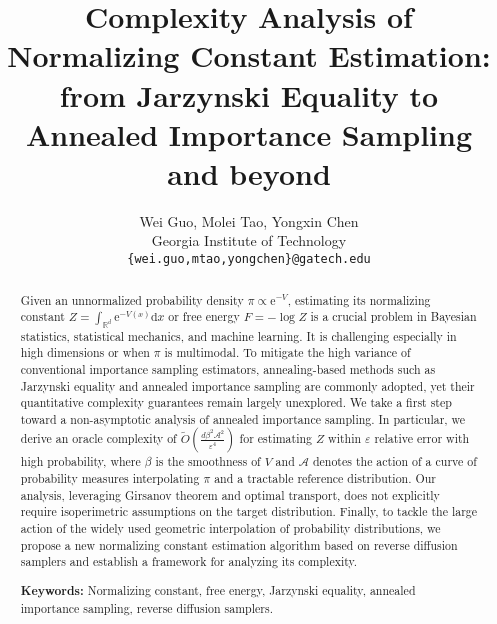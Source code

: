 \documentclass[10pt]{article}
\title{Complexity Analysis of Normalizing Constant Estimation: from Jarzynski Equality to Annealed Importance Sampling and beyond}
\author{Wei Guo, Molei Tao, Yongxin Chen\\Georgia Institute of Technology\\\texttt{\{wei.guo,mtao,yongchen\}@gatech.edu}}
\date{}
\begin{document}
\maketitle
\begin{abstract}
    Given an unnormalized probability density $\pi\propto\mathrm{e}^{-V}$, estimating its normalizing constant $Z=\int_{\mathbb{R}^d}\mathrm{e}^{-V(x)}\mathrm{d}x$ or free energy $F=-\log Z$ is a crucial problem in Bayesian statistics, statistical mechanics, and machine learning. It is challenging especially in high dimensions or when $\pi$ is multimodal. To mitigate the high variance of conventional importance sampling estimators, annealing-based methods such as Jarzynski equality and annealed importance sampling are commonly adopted, yet their quantitative complexity guarantees remain largely unexplored. We take a first step toward a non-asymptotic analysis of annealed importance sampling. In particular, we derive an oracle complexity of $\widetilde{O}\left(\frac{d\beta^2{\mathcal{A}}^2}{\varepsilon^4}\right)$ for estimating $Z$ within $\varepsilon$ relative error with high probability, where $\beta$ is the smoothness of $V$ and $\mathcal{A}$ denotes the action of a curve of probability measures interpolating $\pi$ and a tractable reference distribution. Our analysis, leveraging Girsanov theorem and optimal transport, does not explicitly require isoperimetric assumptions on the target distribution. Finally, to tackle the large action of the widely used geometric interpolation of probability distributions, we propose a new normalizing constant estimation algorithm based on reverse diffusion samplers and establish a framework for analyzing its complexity.

    \noindent\textbf{Keywords:} Normalizing constant, free energy, Jarzynski equality, annealed importance sampling, reverse diffusion samplers.
\end{abstract}










\newpage


\newpage
\appendix
\tableofcontents
\newpage








\end{document}
